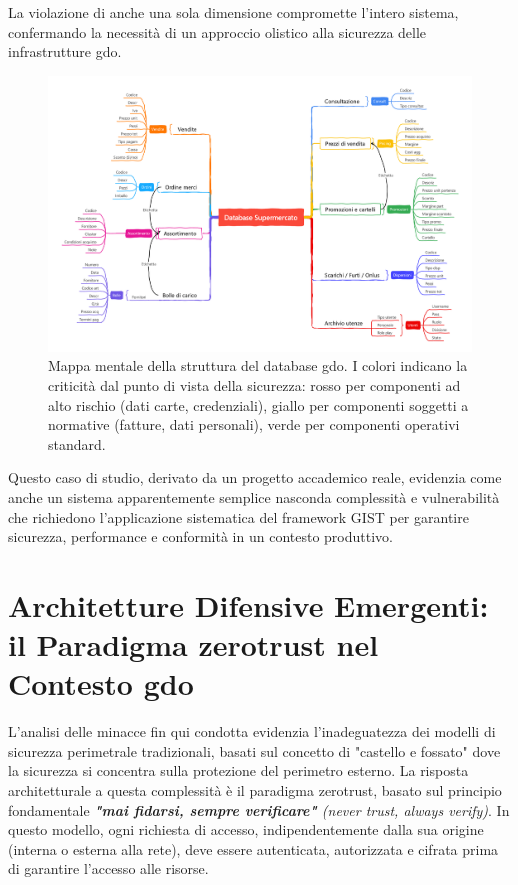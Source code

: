 La violazione di anche una sola dimensione compromette l'intero sistema, confermando la necessità di un approccio olistico alla sicurezza delle infrastrutture \gls{gdo}.

\begin{figure}[htbp]
\centering
\includegraphics[width=\textwidth]{thesis_figures/cap2/DatabaseSupermercato.pdf}
\caption{Mappa mentale della struttura del database \gls{gdo}. I colori indicano la criticità dal punto di vista della sicurezza: rosso per componenti ad alto rischio (dati carte, credenziali), giallo per componenti soggetti a normative (fatture, dati personali), verde per componenti operativi standard.}
\label{fig:database_mindmap}
\end{figure}

Questo caso di studio, derivato da un progetto accademico reale, evidenzia come anche un sistema apparentemente semplice nasconda complessità e vulnerabilità che richiedono l'applicazione sistematica del framework GIST per garantire sicurezza, performance e conformità in un contesto produttivo.

\section{\texorpdfstring{Architetture Difensive Emergenti: il Paradigma \gls{zerotrust} nel Contesto \gls{gdo}}{2.4 - Architetture Difensive Emergenti: il Paradigma Zero Trust nel Contesto GDO}}

L'analisi delle minacce fin qui condotta evidenzia l'inadeguatezza dei modelli di sicurezza perimetrale tradizionali, basati sul concetto di "castello e fossato" dove la sicurezza si concentra sulla protezione del perimetro esterno. La risposta architetturale a questa complessità è il paradigma \gls{zerotrust}, basato sul principio fondamentale \emph{\textbf{"mai fidarsi, sempre verificare"} (never trust, always verify)}. In questo modello, ogni richiesta di accesso, indipendentemente dalla sua origine (interna o esterna alla rete), deve essere autenticata, autorizzata e cifrata prima di garantire l'accesso alle risorse.

